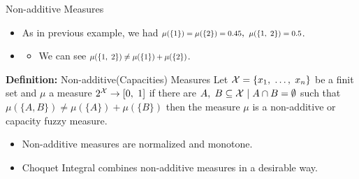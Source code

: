 \documentclass[]{beamer}
\newcommand{\Xtri}{$\blacktriangleright$ }
\newcommand{\itemXtri}{\item[\Xtri]}
\renewcommand{\|}[1][.3em]{\hspace{#1}|\hspace{#1}}
\renewcommand{\,}[1][.3em]{,\hspace{#1}}
\newcommand\Wider[2][3em]{%
\makebox[\linewidth][c]{%
  \begin{minipage}{\dimexpr\textwidth+#1\relax}
  \raggedright#2
  \end{minipage}%
  }%
}
\newcommand*{\Scale}[2][4]{\scalebox{#1}{$#2$}}%
\begin{document}
\begin{frame}{Non-additive Measures}
    \begin{itemize}
    \item As in previous example, we had \textcolor{light-blue}{$\Scale[0.8]{\mu(\{1\}) = \mu(\{2\}) = 0.45}\,\Scale[0.8]{\mu(\{1\,2\}) = 0.5}$}.
    \item[] 
        \begin{itemize}
        \itemXtri We can see \textcolor{light-blue}{$\Scale[0.8]{\mu(\{1\,2\}) \neq \mu(\{1\}) + \mu(\{2\})}$}.
        \end{itemize}
    \end{itemize}
    \pause
    \begin{block}{\textbf{Definition:} Non-additive(Capacities) Measures}
        Let $\mathcal{X} = \{x_1\,\ldots\,x_n\}$ be a finit set and $\mu$ a measure $2^\mathcal{X} \rightarrow [0\,1]$ if there are $A\,B \subseteq \mathcal{X}\|A \cap B = \emptyset$ such that $\mu(\{A, B\}) \neq \mu(\{A\}) + \mu(\{B\})$ then the measure $\mu$ is a non-additive or capacity fuzzy measure.
    \end{block}
    \pause
    \begin{itemize}
    \itemXtri Non-additive measures are normalized and monotone.\vspace{.5em}
        \Wider[.0cm]{\Scale[0.9]{\vbox{\begin{itemize}
        \item[] $\mu(\emptyset) = 0\, \mu(\mathcal{X}) = 1$ and\vspace{.2em}
        \item[] $\mu(A) \leq \mu(B)\hspace{1em}\forall\hspace{.2em}A \subseteq B \subseteq \mathcal{X}$
        \end{itemize}}}}
    \itemXtri \textcolor{light-blue}{Choquet Integral} combines non-additive measures in a desirable way.
    \end{itemize}
\end{frame}
\end{document}
